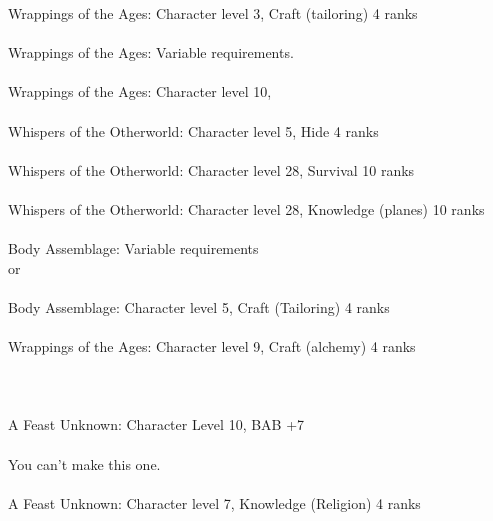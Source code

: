 \begin{multicols}{2}
\begin{small}
Wrappings of the Ages: Character level 3, Craft (tailoring) 4 ranks\\
\\
Wrappings of the Ages: Variable requirements.\\
\\
Wrappings of the Ages: Character level 10, \\
\\
Whispers of the Otherworld: Character level 5, Hide 4 ranks\\
\\
Whispers of the Otherworld: Character level 28, Survival 10 ranks\\
\\
Whispers of the Otherworld: Character level 28, Knowledge (planes) 10 ranks\\
\\
Body Assemblage: Variable requirements\\
or \\
\vspace{20pt}
\\
Body Assemblage: Character level 5, Craft (Tailoring) 4 ranks\\
\\
Wrappings of the Ages: Character level 9, Craft (alchemy) 4 ranks\\
\\
\\
\\
A Feast Unknown: Character Level 10, BAB +7\\
\\
You can't make this one.\\
\\
A Feast Unknown: Character level 7, Knowledge (Religion) 4 ranks\\
\\

\end{small}
\end{multicols}
